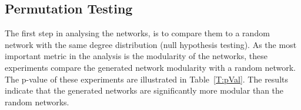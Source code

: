 \documentclass[journal,11pt]{IEEEtran}
\begin{document}
\subsection{Permutation Testing}
\label{S:PT}
The first step in analysing the networks, is to compare them to a random network with the same degree distribution (null hypothesis testing). As the most important metric in the analysis is the modularity of the networks, these experiments compare the generated network modularity with a random network. The p-value of these experiments are illustrated in Table~\ref{T:pVal}. The results indicate that the generated networks are significantly more modular than the random networks.
\begin{table}[t]
\centering
\caption{Permutation Testing: 1000 iterations each network given random edge sampling. The Perm. modularity is the average of the 1000 iterations.}
\scriptsize
{}
\label{T:pVal}
\end{table}
\end{document}
